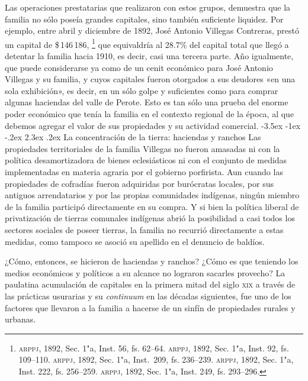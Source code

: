 \documentclass[14pt,twoside,final]{extbook} %
\makeatletter
\let\oldfootnote\footnote
\renewcommand\footnote[1]{%
\oldfootnote{\hspace{1mm}#1}}
\renewcommand\section{\@startsection {section}{1}{\z@}%
                                     {-3.5ex \@plus -1ex \@minus -.2ex}%
                                     {2.3ex \@plus .2ex}%
                                     {\normalfont\large\bfseries\sc}}
\makeatother
\begin{document}
Las operaciones prestatarias que realizaron con estos grupos, demuestra que la familia no sólo poseía grandes capitales, sino también suficiente liquidez. Por ejemplo, entre abril y diciembre de 1892, José Antonio Villegas Contreras, prestó un capital de \$\,146\,186,\footnote{\textsc{arppj}, 1892, Sec. 1"a, Inst. 56, fs. 62--64. \textsc{arppj}, 1892, Sec. 1"a, Inst. 92, fs. 109--110. \textsc{arppj}, 1892, Sec. 1"a, Inst.~209, fs. 236--239. \textsc{arppj}, 1892, Sec. 1"a, Inst. 222, fs. 256--259. \textsc{arppj}, 1892, Sec. 1"a, Inst. 249, fs. 293--296.} que equivaldría al 28.7\% del capital total que llegó a detentar la familia hacia 1910, es decir, casi una tercera parte. Año igualmente, que puede considerarse ya como de un cenit económico para José Antonio Villegas y su familia, y cuyos capitales fueron otorgados a sus deudores «en una sola exhibición», es decir, en un sólo golpe y suficientes como para comprar algunas haciendas del valle de Perote. Esto es tan sólo una prueba del enorme poder económico que tenía la familia en el contexto regional de la época, al que debemos agregar el valor de sus propiedades y su actividad comercial.
\section{La concentración de la tierra: haciendas y ranchos}
\label{sec:concentracion-haciendas-y-ranchos}
Las propiedades territoriales de la familia Villegas no fueron amasadas ni con la política desamortizadora de bienes eclesiásticos ni con el conjunto de medidas implementadas en materia agraria por el gobierno porfirista. Aun cuando las propiedades de cofradías fueron adquiridas por burócratas locales, por sus antiguos arrendatarios y por las propias comunidades indígenas, ningún miembro de la familia participó directamente en su compra. Y si bien la política liberal de privatización de tierras comunales indígenas abrió la posibilidad a casi todos los sectores sociales de poseer tierras, la familia no recurrió directamente a estas medidas, como tampoco se asoció su apellido en el denuncio de baldíos.

¿Cómo, entonces, se hicieron de haciendas y ranchos? ¿Cómo es que teniendo los medios económicos y políticos a su alcance no lograron sacarles provecho? La paulatina acumulación de capitales en la primera mitad del siglo \textsc{xix} a través de las prácticas usurarias y su \emph{continuum} en las décadas siguientes, fue uno de los factores que llevaron a la familia a hacerse de un sinfín de propiedades rurales y urbanas.\protect\enlargethispage*{\baselineskip}
\end{document}
